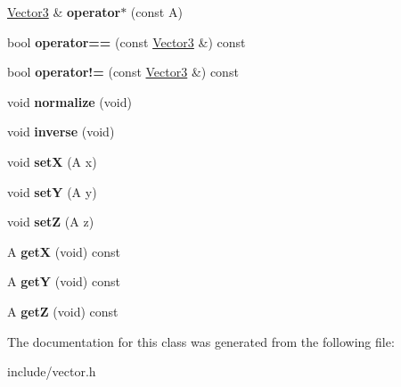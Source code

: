 \begin{DoxyCompactItemize}
\item 
\hypertarget{classVector3_ab8e1cfab4a2a53d1b55d3b0baaec75d8}{}\hyperlink{classVector3}{Vector3} \& {\bfseries operator$\ast$} (const A)\label{classVector3_ab8e1cfab4a2a53d1b55d3b0baaec75d8}

\item 
\hypertarget{classVector3_a4753610ee9adfdc61d3b879f7e08248f}{}bool {\bfseries operator==} (const \hyperlink{classVector3}{Vector3} \&) const \label{classVector3_a4753610ee9adfdc61d3b879f7e08248f}

\item 
\hypertarget{classVector3_a92b7d996777c51076c20631a873ddd95}{}bool {\bfseries operator!=} (const \hyperlink{classVector3}{Vector3} \&) const \label{classVector3_a92b7d996777c51076c20631a873ddd95}

\item 
\hypertarget{classVector3_a519e4c038eb7f15d3bb28248689d1c67}{}void {\bfseries normalize} (void)\label{classVector3_a519e4c038eb7f15d3bb28248689d1c67}

\item 
\hypertarget{classVector3_ac64aae49b1d7a14bcce08798c9742ccf}{}void {\bfseries inverse} (void)\label{classVector3_ac64aae49b1d7a14bcce08798c9742ccf}

\item 
\hypertarget{classVector3_a803a1e952af4889ced933138058a77ae}{}void {\bfseries set\+X} (A x)\label{classVector3_a803a1e952af4889ced933138058a77ae}

\item 
\hypertarget{classVector3_a64bfe78a098946585eb3ad4dd5202197}{}void {\bfseries set\+Y} (A y)\label{classVector3_a64bfe78a098946585eb3ad4dd5202197}

\item 
\hypertarget{classVector3_a614555a90ddab138440276e620e7dd22}{}void {\bfseries set\+Z} (A z)\label{classVector3_a614555a90ddab138440276e620e7dd22}

\item 
\hypertarget{classVector3_a20ecfe73d5eb26043629548817f23227}{}A {\bfseries get\+X} (void) const \label{classVector3_a20ecfe73d5eb26043629548817f23227}

\item 
\hypertarget{classVector3_aadf174ba5e5f5053336e6c2305c91ee5}{}A {\bfseries get\+Y} (void) const \label{classVector3_aadf174ba5e5f5053336e6c2305c91ee5}

\item 
\hypertarget{classVector3_acecef0e66a458dbbebb8c66cac8dbfc5}{}A {\bfseries get\+Z} (void) const \label{classVector3_acecef0e66a458dbbebb8c66cac8dbfc5}

\end{DoxyCompactItemize}


The documentation for this class was generated from the following file\+:\begin{DoxyCompactItemize}
\item 
include/vector.\+h\end{DoxyCompactItemize}
